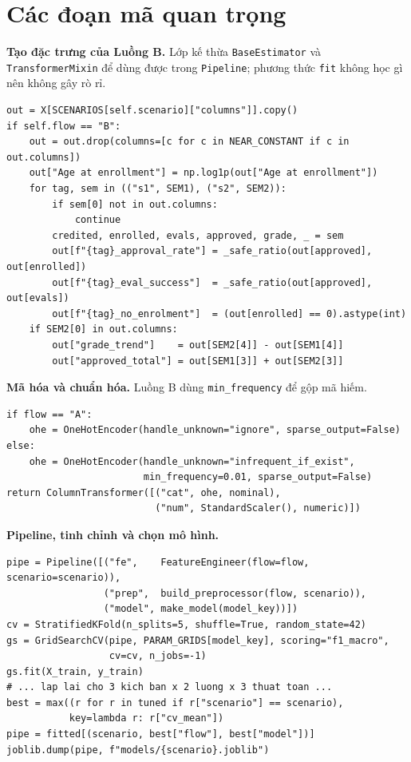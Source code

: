 \documentclass[12pt,a4paper,oneside]{report}
\newcommand{\code}[1]{\texttt{#1}}
\begin{document}
\section{Các đoạn mã quan trọng}
\textbf{Tạo đặc trưng của Luồng B.} Lớp kế thừa \code{BaseEstimator} và \code{TransformerMixin} để dùng được trong
\code{Pipeline}; phương thức \code{fit} không học gì nên không gây rò rỉ.
\begin{lstlisting}[caption={Tạo đặc trưng trong \code{FeatureEngineer.transform} (rút gọn)}]
out = X[SCENARIOS[self.scenario]["columns"]].copy()
if self.flow == "B":
    out = out.drop(columns=[c for c in NEAR_CONSTANT if c in out.columns])
    out["Age at enrollment"] = np.log1p(out["Age at enrollment"])
    for tag, sem in (("s1", SEM1), ("s2", SEM2)):
        if sem[0] not in out.columns:
            continue
        credited, enrolled, evals, approved, grade, _ = sem
        out[f"{tag}_approval_rate"] = _safe_ratio(out[approved], out[enrolled])
        out[f"{tag}_eval_success"]  = _safe_ratio(out[approved], out[evals])
        out[f"{tag}_no_enrolment"]  = (out[enrolled] == 0).astype(int)
    if SEM2[0] in out.columns:
        out["grade_trend"]    = out[SEM2[4]] - out[SEM1[4]]
        out["approved_total"] = out[SEM1[3]] + out[SEM2[3]]
\end{lstlisting}

\textbf{Mã hóa và chuẩn hóa.} Luồng B dùng \code{min\_frequency} để gộp mã hiếm.
\begin{lstlisting}[caption={Hàm \code{build\_preprocessor}}]
if flow == "A":
    ohe = OneHotEncoder(handle_unknown="ignore", sparse_output=False)
else:
    ohe = OneHotEncoder(handle_unknown="infrequent_if_exist",
                        min_frequency=0.01, sparse_output=False)
return ColumnTransformer([("cat", ohe, nominal),
                          ("num", StandardScaler(), numeric)])
\end{lstlisting}

\textbf{Pipeline, tinh chỉnh và chọn mô hình.}
\begin{lstlisting}[caption={Ghép pipeline, GridSearchCV và chọn theo CV}]
pipe = Pipeline([("fe",    FeatureEngineer(flow=flow, scenario=scenario)),
                 ("prep",  build_preprocessor(flow, scenario)),
                 ("model", make_model(model_key))])
cv = StratifiedKFold(n_splits=5, shuffle=True, random_state=42)
gs = GridSearchCV(pipe, PARAM_GRIDS[model_key], scoring="f1_macro",
                  cv=cv, n_jobs=-1)
gs.fit(X_train, y_train)
# ... lap lai cho 3 kich ban x 2 luong x 3 thuat toan ...
best = max((r for r in tuned if r["scenario"] == scenario),
           key=lambda r: r["cv_mean"])
pipe = fitted[(scenario, best["flow"], best["model"])]
joblib.dump(pipe, f"models/{scenario}.joblib")
\end{lstlisting}
\end{document}
